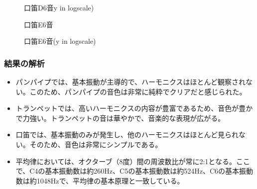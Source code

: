 \documentclass{article}
\begin{document}
\begin{spacing}{1.2}
\begin{figure}[htbp]
        \begin{minipage}[b]{0.49\textwidth}
          \centering
          \caption{口笛D6音y in logscale)}
        \end{minipage}
    \end{figure}
    \begin{figure}[htbp]
        \centering
        \begin{minipage}[b]{0.49\textwidth} %
          \centering
          \caption{口笛E6音}
        \end{minipage}%
        \begin{minipage}[b]{0.49\textwidth}
          \centering
          \caption{口笛E6音(y in logscale)}
        \end{minipage}
    \end{figure}
    \FloatBarrier
    \subsubsection*{結果の解析}
    \begin{itemize}[label={--}]
        \item パンパイプでは、基本振動が主導的で、ハーモニクスはほとんど観察されない。このため、パンパイプの音色は非常に純粋でクリアだと感じられた。
        \item トランペットでは、高いハーモニクスの内容が豊富であるため、音色が豊かで力強い。トランペットの音は華やかで、音楽的な表現が広がる。
        \item 口笛では、基本振動のみが発生し、他のハーモニクスはほとんど見られない。そのため、音色は非常にシンプルである。
        \item 平均律においては、オクターブ（8度）間の周波数比が常に2:1となる。ここで、C4の基本振動数は約260Hz、C5の基本振動数は約524Hz、C6の基本振動数は約1048Hzで、平均律の基本原理と一致している。
    \end{itemize}
\end{spacing}
\end{document}
